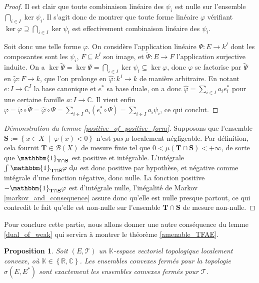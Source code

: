 \documentclass[a4paper,12pt]{article}
\newtheorem{proposition}[theorem]{Proposition}
\newcommand{\R}{\mathbb{R}}
\newcommand{\C}{\mathbb{C}}
\newcommand{\K}{\mathbb{K}}
\newcommand{\Bor}{\mathcal{B}}
\newcommand{\set}[1]{\left\{ #1 \right\}}
\newcommand{\indic}{\mathbbm{1}}
\newcommand{\integral}[4]{\int_{#1}^{#2} #3~\mathrm{d}#4}
\newcommand{\tq}{\;\middle|\;}
\newcommand{\comp}{\circ}
\begin{document}
\begin{proof}
    Il est clair que toute combinaison linéaire des $\psi_i$ est nulle sur l'ensemble $\bigcap_{i\in I}\ker\psi_i$.
    Il s'agit donc de montrer que toute forme linéaire $\varphi$ vérifiant $\ker\varphi\supseteq\bigcap_{i\in I}\ker\psi_i$ est effectivement 
    combinaison linéaire des $\psi_i$. 
    
    Soit donc une telle forme $\varphi$. On considère l'application linéaire $\Psi : E\to k^I$ 
    dont les composantes sont les $\psi_i$, $F\subseteq k^I$ son image, et $\widetilde{\Psi}:E\to F$ l'application surjective induite.
    On a $\ker\widetilde{\Psi} = \ker\Psi = \bigcap_{i\in I}\ker\psi_i \subseteq \ker \varphi$, donc $\varphi$ se factorise 
    par $\widetilde{\Psi}$ en $\widetilde{\varphi}:F\to k$, que l'on prolonge en $\widehat{\varphi}:k^I\to k$ de manière arbitraire.
    En notant $e : I\to\C^I$ la base canonique et $e^*$ sa base duale, on a donc $\widehat{\varphi} = \sum_{i\in I} a_i e^*_i$
    pour une certaine famille $a : I\to\C$. Il vient enfin
    $\varphi = \widetilde{\varphi}\comp\widetilde{\Psi} = \widehat{\varphi}\comp\Psi = \sum_{i\in I} a_i (e^*_i \comp\Psi) = \sum_{i\in I} a_i\psi_i$,
    ce qui conclut.
\end{proof}

\begin{proof}[Démonstration du lemme \ref{positive_of_positive_form}]
    Supposons que l'ensemble $\mathbf{S} := \set{x\in X\tq\varphi(x)<0}$ n'est \emph{pas} $\mu$-localement-négligeable. Par définition, cela fournit 
    $\mathbf{T}\in\Bor(X)$ de mesure finie tel que $0<\mu(\mathbf{T}\cap\mathbf{S})<+\infty$, de sorte que $\indic_{\mathbf{T}\cap\mathbf{S}}$ est positive et intégrable. L'intégrale
    $\integral{}{}{\indic_{\mathbf{T}\cap\mathbf{S}}\varphi}{\mu}$ est donc positive par hypothèse, et négative comme intégrale d'une fonction négative,
    donc nulle. La fonction positive $-\indic_{\mathbf{T}\cap\mathbf{S}}\varphi$ est d'intégrale nulle, 
    l'inégalité de Markov \ref{markov_and_consequence} assure donc qu'elle est nulle presque partout, ce qui contredit le fait qu'elle est non-nulle 
    sur l'ensemble $\mathbf{T}\cap\mathbf{S}$ de mesure non-nulle.
\end{proof}

Pour conclure cette partie, nous allons donner une autre conséquence du lemme \ref{dual_of_weak} qui servira 
à montrer le théorème \ref{amenable_TFAE}.

\begin{proposition}\label{weak_convex_closed}
    Soit $(E, \mathcal{T})$ un $\K$-espace vectoriel topologique localement convexe, où $\K\in\set{\R, \C}$. Les ensembles convexes fermés pour la topologie 
    $\sigma(E, E^*)$ sont exactement les ensembles convexes fermés pour $\mathcal{T}$.
\end{proposition}
\end{document}
